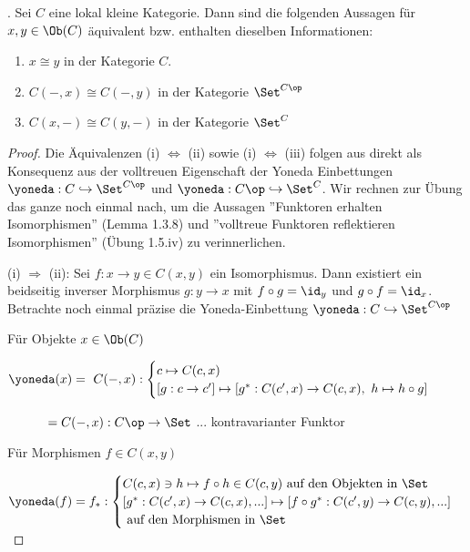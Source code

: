 \documentclass[11pt]{article}
\begin{document}
\begin{theorem} . Sei $C$ eine lokal kleine Kategorie. Dann sind die folgenden Aussagen für $x,y\in \Ob(C)$ äquivalent bzw. enthalten dieselben Informationen:
\begin{enumerate}[label=(\roman*)]
    \item $x\cong y$ in der Kategorie $C$.
    \item $C(-,x)\cong C(-,y)$ in der Kategorie $\Set^{C\op}$
    \item $C(x,-)\cong C(y,-)$ in der Kategorie $\Set^C$
    \end{enumerate}

\begin{proof} Die Äquivalenzen (i) $\Leftrightarrow$ (ii) sowie (i) $\Leftrightarrow$ (iii) folgen aus direkt als Konsequenz aus der volltreuen Eigenschaft der Yoneda Einbettungen $\yoneda: C\hookrightarrow \Set^{C\op}$ und $\yoneda: C\op \hookrightarrow \Set^C$. Wir rechnen zur Übung das ganze noch einmal nach, um die Aussagen ''Funktoren erhalten Isomorphismen'' (Lemma 1.3.8) und ''volltreue Funktoren reflektieren Isomorphismen'' (Übung 1.5.iv) zu verinnerlichen.\bigskip

(i) $\Longrightarrow$ (ii): Sei $f:x\to y \in C(x,y)$ ein Isomorphismus. Dann existiert ein beidseitig inverser Morphismus $g:y\to x$ mit $f\circ g = \id_y$ und $g\circ f = \id_x$. Betrachte noch einmal präzise die Yoneda-Einbettung $\yoneda: C\hookrightarrow \Set^{C\op}$\bigskip

Für Objekte $x\in \Ob(C)$\bigskip

$\displaystyle \yoneda(x) = \ C(-,x): \begin{cases} 
    c\mapsto C(c,x) \\
    [g: c \to c'] \mapsto [g^*: C(c',x) \to C(c,x),\ h\mapsto h\circ g]
\end{cases}$\bigskip

$ \displaystyle \mbox{}\hspace{1cm}  = C(-,x): C\op \to \Set $ ... kontravarianter Funktor \bigskip 

Für Morphismen $f\in C(x,y)$\bigskip

$\displaystyle \yoneda(f) = f_*:  \begin{cases}
    C(c,x)\ni h\mapsto f\circ h \in C(c,y) \text{ auf den Objekten in $\Set$}\\
    [g^*:C(c',x) \to C(c,x),...] \mapsto [f\circ g^*: C(c',y) \to C(c,y),...]\\
    \text{ auf den Morphismen in $\Set$}
\end{cases}$\bigskip


\end{proof}
\end{theorem}
\end{document}
